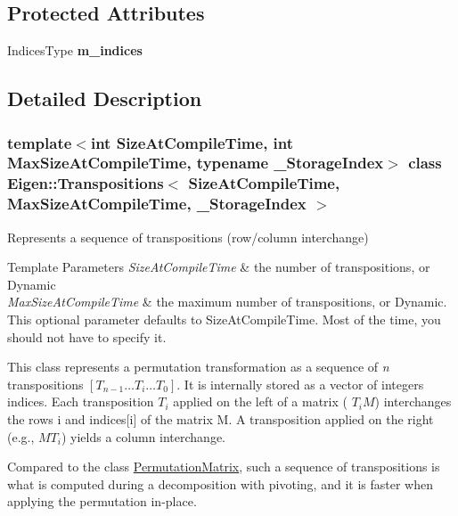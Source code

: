 \subsection*{Protected Attributes}
\begin{DoxyCompactItemize}
\item 
\mbox{\label{class_eigen_1_1_transpositions_a2a8d24e0368be00384c885e53d4ad3cf}} 
Indices\+Type {\bfseries m\+\_\+indices}
\end{DoxyCompactItemize}


\subsection{Detailed Description}
\subsubsection*{template$<$int Size\+At\+Compile\+Time, int Max\+Size\+At\+Compile\+Time, typename \+\_\+\+Storage\+Index$>$\newline
class Eigen\+::\+Transpositions$<$ Size\+At\+Compile\+Time, Max\+Size\+At\+Compile\+Time, \+\_\+\+Storage\+Index $>$}

Represents a sequence of transpositions (row/column interchange) 


\begin{DoxyTemplParams}{Template Parameters}
{\em Size\+At\+Compile\+Time} & the number of transpositions, or Dynamic \\
\hline
{\em Max\+Size\+At\+Compile\+Time} & the maximum number of transpositions, or Dynamic. This optional parameter defaults to Size\+At\+Compile\+Time. Most of the time, you should not have to specify it.\\
\hline
\end{DoxyTemplParams}
This class represents a permutation transformation as a sequence of {\itshape n} transpositions $[T_{n-1} \ldots T_{i} \ldots T_{0}]$. It is internally stored as a vector of integers {\ttfamily indices}. Each transposition $ T_{i} $ applied on the left of a matrix ( $ T_{i} M$) interchanges the rows {\ttfamily i} and {\ttfamily indices}\mbox{[}i\mbox{]} of the matrix {\ttfamily M}. A transposition applied on the right (e.\+g., $ M T_{i}$) yields a column interchange.

Compared to the class \mbox{\hyperlink{class_eigen_1_1_permutation_matrix}{Permutation\+Matrix}}, such a sequence of transpositions is what is computed during a decomposition with pivoting, and it is faster when applying the permutation in-\/place.

